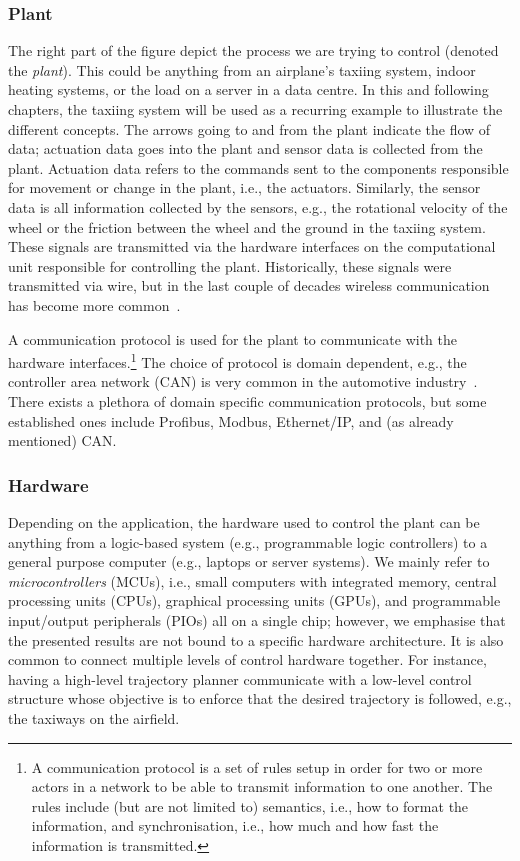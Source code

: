 \subsubsection{Plant}%
%
The right part of the figure depict the process we are trying to control (denoted the \emph{plant}).
This could be anything from an airplane's taxiing system, indoor heating systems, or the load on a server in a data centre.
In this and following chapters, the taxiing system will be used as a recurring example to illustrate the different concepts.
The arrows going to and from the plant indicate the flow of data; actuation data goes into the plant and sensor data is collected from the plant.
Actuation data refers to the commands sent to the components responsible for movement or change in the plant, i.e., the actuators.
Similarly, the sensor data is all information collected by the sensors, e.g., the rotational velocity of the wheel or the friction between the wheel and the ground in the taxiing system.
These signals are transmitted via the hardware interfaces on the computational unit responsible for controlling the plant.
Historically, these signals were transmitted via wire, but in the last couple of decades wireless communication has become more common~\cite{Park:2018}.

A communication protocol is used for the plant to communicate with the hardware interfaces.\footnote{A communication protocol is a set of rules setup in order for two or more actors in a network to be able to transmit information to one another. The rules include (but are not limited to) semantics, i.e., how to format the information, and synchronisation, i.e., how much and how fast the information is transmitted.}
The choice of protocol is domain dependent, e.g., the controller area network (CAN) is very common in the automotive industry~\cite{Voss:2005}.
There exists a plethora of domain specific communication protocols, but some established ones include Profibus, Modbus, Ethernet/IP, and (as already mentioned) CAN.

\subsubsection{Hardware}%
%
Depending on the application, the hardware used to control the plant can be anything from a logic-based system (e.g., programmable logic controllers) to a general purpose computer (e.g., laptops or server systems).
We mainly refer to \emph{microcontrollers} (MCUs), i.e., small computers with integrated memory, central processing units (CPUs), graphical processing units (GPUs), and programmable input/output peripherals (PIOs) all on a single chip; however, we emphasise that the presented results are not bound to a specific hardware architecture.
It is also common to connect multiple levels of control hardware together.
For instance, having a high-level trajectory planner communicate with a low-level control structure whose objective is to enforce that the desired trajectory is followed, e.g., the taxiways on the airfield.

